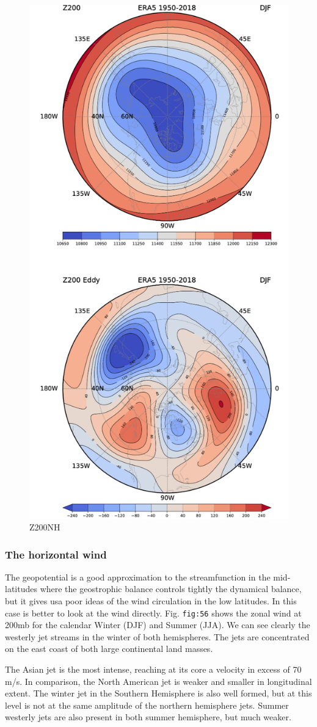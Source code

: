 \begin{figure}[h!]
    \centering
    \includegraphics[width=0.5\linewidth]{uploads/Screenshot 2024-11-19 132440.png}
    \caption{Z200NH}
    \label{fig:enter-label}
\end{figure}


\subsubsection{The horizontal wind}\label{the-horizontal-wind}

The geopotential is a good approximation to the streamfunction in the
mid-latitudes where the geostrophic balance controls tightly the
dynamical balance, but it gives usa poor ideas of the wind circulation
in the low latitudes. In this case is better to look at the wind
directly. Fig. \texttt{fig:56} shows the zonal wind at 200mb for the
calendar Winter (DJF) and Summer (JJA). We can see clearly the westerly
jet streams in the winter of both hemispheres. The jets are concentrated
on the east coast of both large continental land masses.

The Asian jet is the most intense, reaching at its core a velocity in
excess of 70 m/s. In comparison, the North American jet is weaker and
smaller in longitudinal extent. The winter jet in the Southern
Hemisphere is also well formed, but at this level is not at the same
amplitude of the northern hemisphere jets. Summer westerly jets are also
present in both summer hemisphere, but much weaker.

